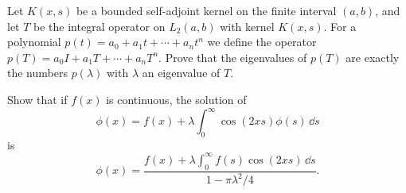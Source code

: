 \begin{Exercise}
  Let $K(x,s)$ be a bounded self-adjoint kernel on the finite interval $(a,b)$,
  and let $T$ be the integral operator on $L_2(a,b)$ with kernel $K(x,s)$.
  For a polynomial $p(t) = a_0 + a_1 t + \cdots + a_n t^n$ we define the
  operator $p(T) = a_0 I + a_1 T + \cdots + a_n T^n$.  Prove that the eigenvalues
  of $p(T)$ are exactly the numbers $p(\lambda)$ with $\lambda$ an eigenvalue
  of $T$.
\end{Exercise}



\begin{Exercise}
  Show that if $f(x)$ is continuous, the solution of
  \[
  \phi(x) = f(x) + \lambda \int_0^\infty \cos(2 x s) \phi(s) \,\dd s
  \]
  is
  \[
  \phi(x) = \frac{ f(x) + \lambda \int_0^\infty f(s) \cos(2 x s) \,\dd s }
  { 1 - \pi \lambda^2 / 4 }.
  \]
\end{Exercise}



